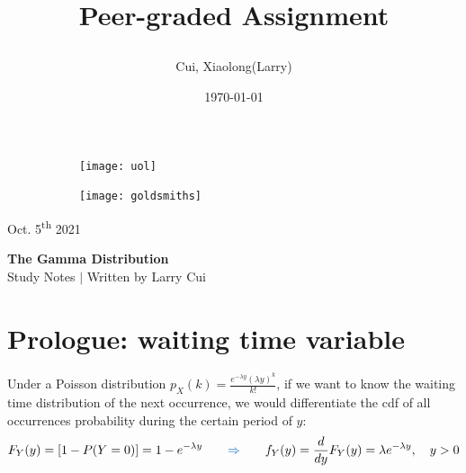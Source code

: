 \documentclass[11pt]{article}
\title{\vspace{-90pt} 



\textbf  {Peer-graded Assignment} }
\author{Cui, Xiaolong(Larry)}
\date{\today}
\begin{document}

\thispagestyle{plain}


\begin{figure}[H] %
  \begin{subfigure}{0.3\textwidth}
    \texttt{[image: uol]}
  \end{subfigure}
  \hfill
  \begin{subfigure}{0.3\textwidth}
    \texttt{[image: goldsmiths]}
  \end{subfigure}
\end{figure}


\begin{flushright}
\footnotesize {Oct. 5\textsuperscript{th} 2021}
\end{flushright}

\begin{center}
\textbf{The Gamma Distribution} \\
\footnotesize {Study Notes $ | $ Written by Larry Cui}
\end{center}





\setcounter{figure}{0}

\vspace{10pt}


\section{\normalsize Prologue: waiting time variable}

Under a Poisson distribution $\displaystyle p_X (k) = \frac{e^{-\lambda y} (\lambda y)^k}{k!}$,  if we want to know the waiting time distribution of the next occurrence,  we would differentiate the cdf of all occurrences probability during the certain period of $y$:
\[
F_Y (y) = [1-P(Y=0)]= 1- e^{-\lambda y} \qquad {\color{RoyalBlue} \Rightarrow} \qquad f_Y (y) = \frac{d}{dy} F_Y(y) = \lambda e^{-\lambda y},  \quad y>0
\]
\end{document}
